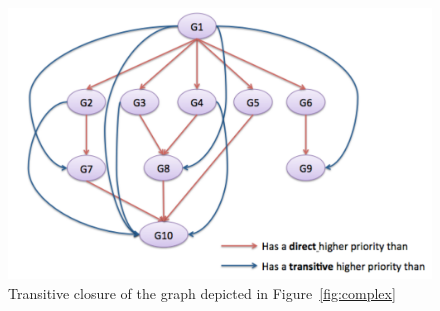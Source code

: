 \documentclass[11pt]{report}
\begin{document}
\begin{figure}[!ht]
      \begin{minipage}[c]{\textwidth}
      \centering
      \includegraphics[scale=0.5]{pictures/transitive.pdf}
      \end{minipage}
      \caption{Transitive closure of the graph depicted in Figure~\ref{fig:complex}}
      \label{fig:transitive} 
\end{figure}
\end{document}
